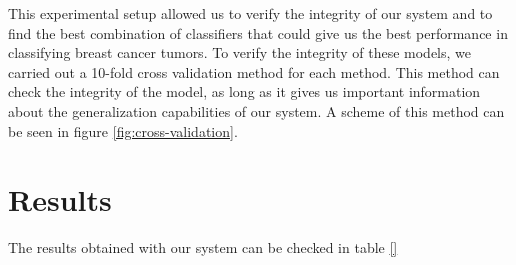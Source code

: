 \documentclass[
  twoside,
  11pt, a4paper,
  footinclude=true,
  headinclude=true,
  cleardoublepage=empty
]{scrbook}
\begin{document}
      This experimental setup allowed us to verify the integrity of our system and to find the best combination of classifiers that could give us the best performance in classifying breast cancer tumors. To verify the integrity of these models, we carried out a 10-fold cross validation method for each method. This method can check the integrity of the model, as long as it gives us important information about the generalization capabilities of our system. A scheme of this method can be seen in figure \ref{fig:cross-validation}.


    \section{Results} \label{experiments:results}
      The results obtained with our system can be checked in table \ref{}
\end{document}

